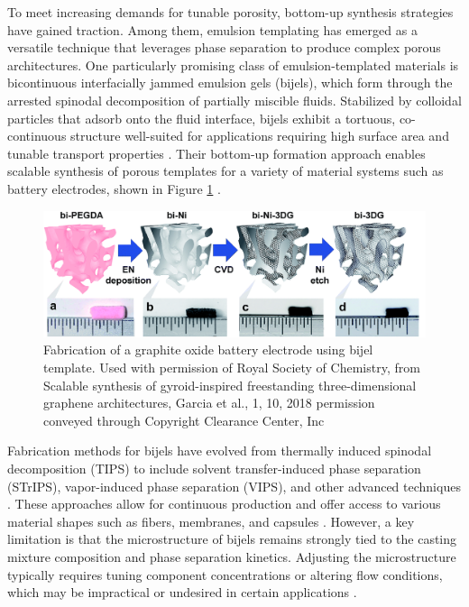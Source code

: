 To meet increasing demands for tunable porosity, bottom-up synthesis strategies have gained traction. Among them, emulsion templating has emerged as a 
versatile technique that leverages phase separation to produce complex porous architectures. One particularly promising class of emulsion-templated 
materials is bicontinuous interfacially jammed emulsion gels (bijels), which form through the arrested spinodal decomposition of partially miscible 
fluids. Stabilized by colloidal particles that adsorb onto the fluid interface, bijels exhibit a tortuous, co-continuous structure well-suited for 
applications requiring high surface area and tunable transport properties \cite{stratford_colloidal_2005, herzig_bicontinuous_2007, lee_bicontinuous_2010}. 
Their bottom-up formation approach enables scalable synthesis of porous templates for a variety of material systems such as battery electrodes, shown in
Figure \ref{fig:bijel_template} 
\cite{cha_bicontinuous_2019, samdani_bicontinuous_2017, thorson_bijel-templated_2019}.

\begin{figure}
    \centering
    \includegraphics[scale = 0.5]{figures/introduction/bijel_templating.png}
    \caption{Fabrication of a graphite oxide battery electrode using bijel template. Used with permission of 
    Royal Society of Chemistry, from Scalable synthesis of gyroid-inspired freestanding three-dimensional graphene architectures, 
    Garcia et al., 1, 10, 2018 permission conveyed through Copyright Clearance Center, Inc}
    \label{fig:bijel_template}
\end{figure}

Fabrication methods for bijels have evolved from thermally induced spinodal decomposition (TIPS) to include solvent transfer-induced phase separation (STrIPS), 
vapor-induced phase separation (VIPS), and other advanced techniques \cite{haase_continuous_2015, wang_scalable_2020, amirfattahi_fabrication_2024}. 
These approaches allow for continuous production and offer access to various material shapes such as fibers, membranes, and capsules 
\cite{boakye-ansah_controlling_2020, kharal_hightensile_2020}. However, a key limitation is that the microstructure of bijels remains 
strongly tied to the casting mixture composition and phase separation kinetics. Adjusting the microstructure typically requires tuning 
component concentrations or altering flow conditions, which may be impractical or undesired in certain applications 
\cite{haase_continuous_2015, reeves_particle-size_2015}. 

